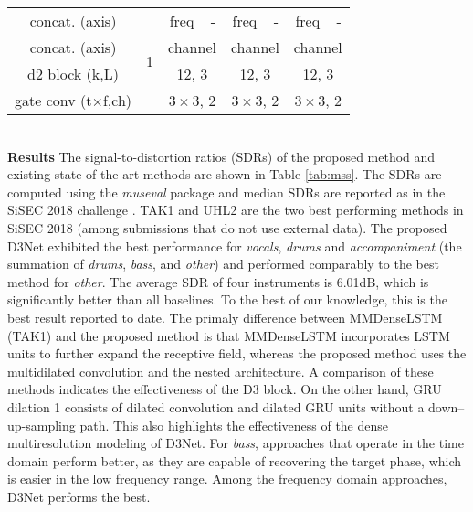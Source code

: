 \documentclass[final]{cvpr}
\begin{document}
\begin{table*}[t]
{\begin{tabular}{ c | c | c | c | c | c | c | c | c | c | c}
        \hline
        concat. (axis) & \multirow{4}{*}{1} & \multicolumn{2}{c|}{freq} & - & \multicolumn{2}{c|}{freq} & - & \multicolumn{2}{c|}{freq} & - \\
        \cline{3-11}
        concat. (axis) &  & \multicolumn{3}{c|}{channel} &  \multicolumn{3}{c|}{channel} & \multicolumn{3}{c}{channel}\\
        \cline{3-11}
        d2 block (k,L) & & \multicolumn{3}{c|}{12, 3} & \multicolumn{3}{c|}{12, 3} & \multicolumn{3}{c}{12, 3} \\   
        \cline{3-11}
        gate conv (t$\times$f,ch) &   & \multicolumn{3}{c|}{$3\times3$, 2} &  \multicolumn{3}{c|}{$3\times3$, 2}&  \multicolumn{3}{c}{$3\times3$, 2}\\
        \hline
      \end{tabular}
    }
\end{table*}
\vspace{3mm}\\
\textbf{Results} \hspace{1mm}
The signal-to-distortion ratios (SDRs) of the proposed method and existing state-of-the-art methods are shown in Table \ref{tab:mss}. The SDRs are computed using  the {\it museval} package \cite{sisec2018} and median SDRs are reported as in the SiSEC 2018 challenge \cite{sisec2018}. 
TAK1 \cite{Takahashi18MMDenseLSTM} and UHL2 \cite{Uhlich17} are the two best performing methods in SiSEC 2018 (among submissions that do not use external data).
The proposed D3Net exhibited the best performance for \textit{vocals}, \textit{drums} and  \textit{accompaniment} (the summation of \textit{drums}, \textit{bass}, and \textit{other}) and performed comparably to the best method for \textit{other}. The average SDR of four instruments is 6.01dB, which is significantly better than all baselines. To the best of our knowledge, this is the best result reported to date.
The primaly difference between MMDenseLSTM (TAK1) and the proposed method is that MMDenseLSTM incorporates LSTM units to further expand the receptive field, whereas the proposed method uses the multidilated convolution and the nested architecture. A comparison of these methods indicates the effectiveness of the D3 block.
On the other hand, GRU dilation 1 \cite{Liu19} consists of dilated convolution and dilated GRU units without a down--up-sampling path. This also highlights the effectiveness of the dense multiresolution modeling of D3Net.
For \textit{bass}, approaches that operate in the time domain perform better, as they are capable of recovering the target phase, which is easier in the low frequency range. Among the frequency domain approaches, D3Net performs the best.
\end{document}
